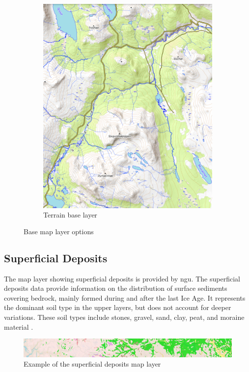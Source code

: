 \begin{figure}[h]
\begin{subfigure}[b]{0.45\textwidth}
         \includegraphics[width=\textwidth]{figures/base_layer_topo.pdf}
         \caption{Terrain base layer}
         \label{fig:base_layer_topo}
     \end{subfigure}
    \caption{Base map layer options}
    \label{fig:base_layers}
\end{figure}

\subsection{Superficial Deposits}
The map layer showing superficial deposits is provided by \acrshort{ngu}. The superficial deposits data provide information on the distribution of surface sediments covering bedrock, mainly formed during and after the last Ice Age. It represents the dominant soil type in the upper layers, but does not account for deeper variations. These soil types include stones, gravel, sand, clay, peat, and moraine material \cite{geonorge_losmasser}. 

\begin{figure}[h]
    \centering
    \includegraphics[width=1\linewidth]{figures/losmasse_eksempel.pdf}
    \caption{Example of the superficial deposits map layer}
    \label{fig:superficial_deposit_example}
\end{figure}

